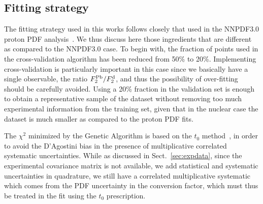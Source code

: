 \subsection{Fitting strategy}

The fitting strategy used in this works follows closely that
used in the NNPDF3.0 proton PDF analysis~\cite{Ball:2014uwa}.
%
We thus discuss here those ingredients that are different as compared
to the NNPDF3.0 case.
%
To begin with, the fraction of points used in the cross-validation
algorithm has been reduced from 50\% to 20\%.
%
Implementing cross-validation is particularly important in this
case since we basically have a single observable, the ratio
$F_2^{\rm Pb}/F_2^{\rm d}$, and thus the possibility of over-fitting should
be carefully avoided.
%
Using a 20\% fraction in the validation set is enough to obtain
a representative sample of the dataset without removing too much
experimental information from the training set, given that
in the nuclear case the dataset is much smaller as compared to the
proton PDF fits.

The $\chi^2$ minimized by the Genetic Algorithm is based on the $t_0$
method~\cite{Ball:2009qv,Ball:2012wy}, in order to avoid the D'Agostini bias in the presence of
multiplicative correlated systematic uncertainties.
%
While as discussed in Sect.~\ref{sec:expdata}, since the experimental
covariance matrix is not available, we add statistical and systematic
uncertainties in quadrature, we still have a correlated multiplicative
systematic which comes from the PDF uncertainty in the conversion factor,
which must thus be treated in the fit using the $t_0$ prescription.



